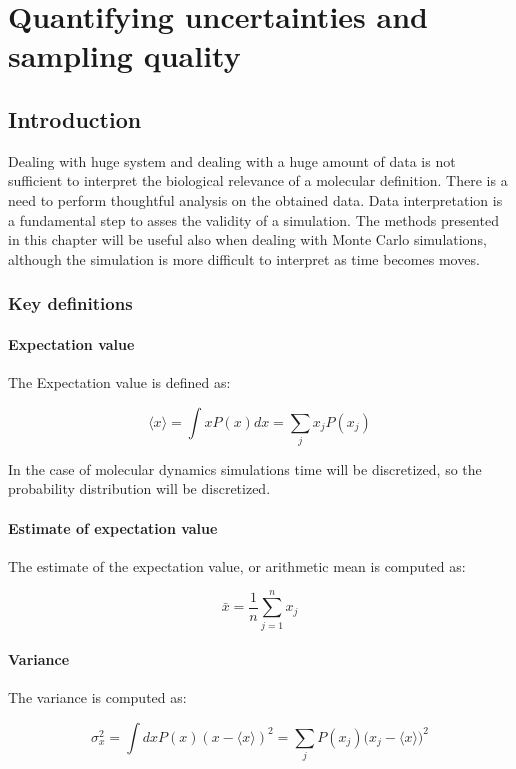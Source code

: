 \graphicspath{{chapters/14/images/}}
\chapter{Quantifying uncertainties and sampling quality}

\section{Introduction}
Dealing with huge system and dealing with a huge amount of data is not sufficient to interpret the biological relevance of a molecular definition.
There is a need to perform thoughtful analysis on the obtained data.
Data interpretation is a fundamental step to asses the validity of a simulation.
The methods presented in this chapter will be useful also when dealing with Monte Carlo simulations, although the simulation is more difficult to interpret as time becomes moves.

	\subsection{Key definitions}

		\subsubsection{Expectation value}
		The Expectation value is defined as:

		$$\langle x\rangle = \int xP(x)dx = \sum\limits_jx_jP(x_j)$$

		In the case of molecular dynamics simulations time will be discretized, so the probability distribution will be discretized.

		\subsubsection{Estimate of expectation value}
		The estimate of the expectation value, or arithmetic mean is computed as:

		$$\bar{x} = \frac{1}{n}\sum\limits_{j=1}^nx_j$$

		\subsubsection{Variance}
		The variance is computed as:

		$$\sigma^2_x = \int dxP(x)(x-\langle x\rangle)^2 = \sum\limits_{j}P(x_j)\bigl(x_j-\langle x\rangle\bigr)^2$$

